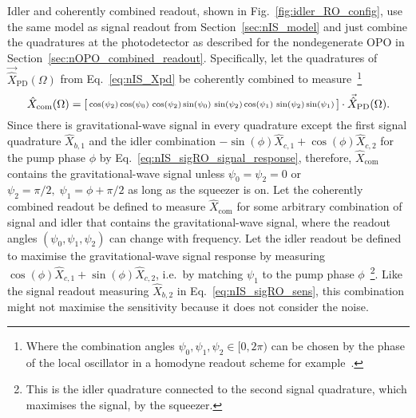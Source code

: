 Idler and coherently combined readout, shown in Fig.~\ref{fig:idler_RO_config}, use the same model as signal readout from Section~\ref{sec:nIS_model} and just combine the quadratures at the photodetector as described for the nondegenerate OPO in Section~\ref{sec:nOPO_combined_readout}. Specifically, let the quadratures of $\vec{\hat X}_\text{PD}(\Omega)$ from Eq.~\ref{eq:nIS_Xpd} be coherently combined to measure~\footnote{Where the combination angles $\psi_0,\psi_1,\psi_2\in[0,2\pi)$ can be chosen by the phase of the local oscillator in a homodyne readout scheme for example~\cite{}.}
\begin{equation}\label{eq:Xcom_three_angles}
\hat X_\text{com}(\Omega)=\begin{bsmallmatrix}\cos(\psi_2)\cos(\psi_0) & \cos(\psi_2)\sin(\psi_0) & \sin(\psi_2)\cos(\psi_1) & \sin(\psi_2)\sin(\psi_1)\end{bsmallmatrix}\cdot\vec{\hat X}_\text{PD}(\Omega).
\end{equation}
Since there is gravitational-wave signal in every quadrature except the first signal quadrature $\hat{X}_{b,1}$ and the idler combination $-\sin(\phi)\hat{X}_{c,1}+\cos(\phi)\hat{X}_{c,2}$ for the pump phase $\phi$ by Eq.~\ref{eq:nIS_sigRO_signal_response}, therefore, $\hat{X}_\text{com}$ contains the gravitational-wave signal unless $\psi_0=\psi_2=0$ or $\psi_2=\pi/2,\;\psi_1=\phi+\pi/2$ as long as the squeezer is on. 
Let the coherently combined readout be defined to measure $\hat{X}_\text{com}$ for some arbitrary combination of signal and idler that contains the gravitational-wave signal, where the readout angles $(\psi_0,\psi_1,\psi_2)$ can change with frequency.
Let the idler readout be defined to maximise the gravitational-wave signal response by measuring $\cos(\phi)\hat{X}_{c,1}+\sin(\phi)\hat{X}_{c,2}$, i.e.\ by matching $\psi_1$ to the pump phase $\phi$~\footnote{This is the idler quadrature connected to the second signal quadrature, which maximises the signal, by the squeezer.}. Like the signal readout measuring $\hat{X}_{b,2}$ in Eq.~\ref{eq:nIS_sigRO_sens}, this combination might not maximise the sensitivity because it does not consider the noise. %
